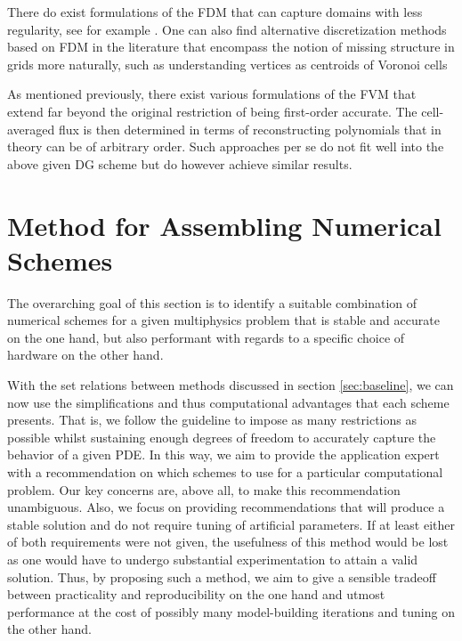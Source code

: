 \documentclass[asi,article,submit,moreauthors]{Definitions/mdpi}
\begin{document}
There do exist formulations of the FDM that can capture domains with less regularity, see for example \cite{fornbergGenerationFiniteDifference1988,visbalUseHigherOrderFiniteDifference2002,zhangThreedimensionalElasticWave2012,perroneGeneralFiniteDifference1975}.
One can also find alternative discretization methods based on FDM in the literature that encompass the notion of missing structure in grids more naturally, such as understanding vertices as centroids of Voronoi cells \cite{sukumarVoronoiCellFinite2003}

As mentioned previously, there exist various formulations of the FVM that extend far beyond the original restriction of being first-order accurate.
The cell-averaged flux is then determined in terms of reconstructing polynomials that in theory can be of arbitrary order.
Such approaches per se do not fit well into the above given DG scheme but do however achieve similar results.

\section{Method for Assembling Numerical Schemes}

The overarching goal of this section is to identify a suitable combination of numerical schemes for a given multiphysics problem that is stable and accurate on the one hand, but also performant with regards to a specific choice of hardware on the other hand.

With the set relations between methods discussed in section \ref{sec:baseline}, we can now use the simplifications and thus computational advantages that each scheme presents.
That is, we follow the guideline to impose as many restrictions as possible whilst sustaining enough degrees of freedom to accurately capture the behavior of a given PDE.
In this way, we aim to provide the application expert with a recommendation on which schemes to use for a particular computational problem.
Our key concerns are, above all, to make this recommendation unambiguous.
Also, we focus on providing recommendations that will produce a stable solution and do not require tuning of artificial parameters.
If at least either of both requirements were not given, the usefulness of this method would be lost as one would have to undergo substantial experimentation to attain a valid solution.
Thus, by proposing such a method, we aim to give a sensible tradeoff between practicality and reproducibility on the one hand and utmost performance at the cost of possibly many model-building iterations and tuning on the other hand.
\end{document}
